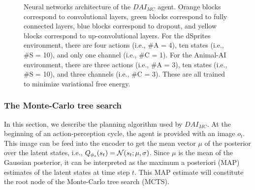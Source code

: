 \documentclass[twoside,11pt]{article}
\let\oldmathcal\mathcal
\renewcommand{\mathcal}[1]{%
  \IfSubStr{ABCDEFGHIJKLMNOPQRSTUVWXYZ}{#1}{\oldmathcal{#1}}{\mathdutchcal{#1}}
}
\begin{document}
\begin{figure}
\begin{center}
	\end{center}
	\caption{Neural networks architecture of the $DAI_{MC}$ agent. Orange blocks correspond to convolutional layers, green blocks correspond to fully connected layers, blue blocks correspond to dropout, and yellow blocks correspond to up-convolutional layers. For the dSprites environment, there are four actions (i.e., \#A = 4), ten states (i.e., \#S = 10), and only one channel (i.e., \#C = 1). For the Animal-AI environment, there are three actions (i.e., \#A = 3), ten states (i.e., \#S = 10), and three channels (i.e., \#C = 3). These are all trained to minimize variational free energy.}
	\label{fig:fountas_dnn}
\end{figure}

\subsubsection{The Monte-Carlo tree search}

In this section, we describe the planning algorithm used by $DAI_{MC}$. At the beginning of an action-perception cycle, the agent is provided with an image $o_t$. This image can be feed into the encoder to get the mean vector $\mu$ of the posterior over the latent states, i.e., $Q_{\phi_s}(s_t) = \mathcal{N}(s_t;\mu, \sigma)$. Since $\mu$ is the mean of the Gaussian posterior, it can be interpreted as the maximum a posteriori (MAP) estimates of the latent states at time step $t$. This MAP estimate will constitute the root node of the Monte-Carlo tree search (MCTS).
\end{document}
